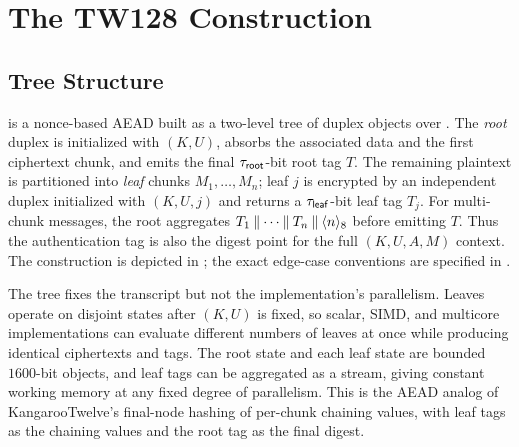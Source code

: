 \section{The TW128 Construction}
\label{sec:tw128}

\subsection{Tree Structure}
\label{sec:design}

\TW{} is a nonce-based AEAD built as a two-level tree of duplex objects over
\Keccakp{}. The \emph{root} duplex is initialized with $(K, U)$, absorbs the
associated data and the first ciphertext chunk, and emits the final
$\tau_{\mathsf{root}}$-bit root tag $T$. The remaining plaintext is partitioned into
\emph{leaf} chunks $M_1,\dots,M_n$; leaf $j$ is encrypted by an independent
duplex initialized with $(K, U, j)$ and returns a $\tau_{\mathsf{leaf}}$-bit leaf tag $T_j$.
For multi-chunk messages, the root aggregates
$T_1 \mathbin{\|} \cdots \mathbin{\|} T_n \mathbin{\|} \langle n \rangle_8$ before emitting
$T$. Thus the authentication tag is also the digest point for the full
$(K, U, A, M)$ context. The construction is depicted in ;
the exact edge-case conventions are specified in .

The tree fixes the transcript but not the implementation's parallelism. Leaves
operate on disjoint states after $(K, U)$ is fixed, so scalar, SIMD, and
multicore implementations can evaluate different numbers of leaves at once
while producing identical ciphertexts and tags. The root state and each leaf
state are bounded $1600$-bit objects, and leaf tags can be aggregated as a
stream, giving constant working memory at any fixed degree of parallelism. This
is the AEAD analog of KangarooTwelve's final-node hashing of per-chunk chaining
values, with leaf tags as the chaining values and the root tag as the final
digest.

